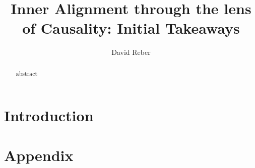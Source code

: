 \documentclass[letterpaper,10pt]{article}
\begin{document}
\title{Inner Alignment through the lens of Causality: Initial Takeaways}

\author{David Reber}
\address{Columbia University}


\begin{abstract}
abstract
\end{abstract}


\section{Introduction}





\section{Appendix}
\end{document}
